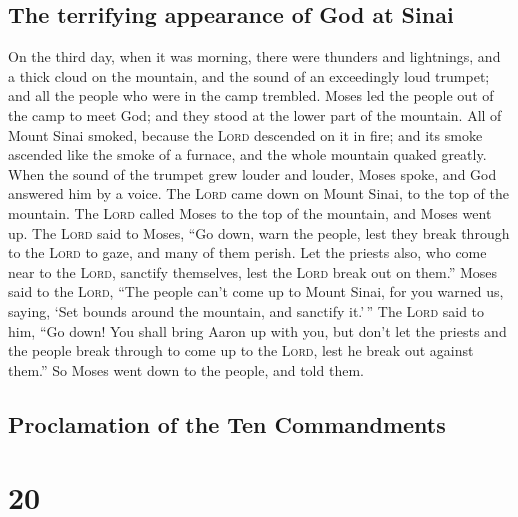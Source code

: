 \hypertarget{the-terrifying-appearance-of-god-at-sinai}{%
\subsection{The terrifying appearance of God at
Sinai}\label{the-terrifying-appearance-of-god-at-sinai}}

 On the third day, when it was morning, there were
thunders and lightnings, and a thick cloud on the mountain, and the
sound of an exceedingly loud trumpet; and all the people who were in the
camp trembled.  Moses led the people out of the camp to
meet God; and they stood at the lower part of the mountain.
 All of Mount Sinai smoked, because the \textsc{Lord}
descended on it in fire; and its smoke ascended like the smoke of a
furnace, and the whole mountain quaked greatly.  When the
sound of the trumpet grew louder and louder, Moses spoke, and God
answered him by a voice.  The \textsc{Lord} came down on
Mount Sinai, to the top of the mountain. The \textsc{Lord} called Moses
to the top of the mountain, and Moses went up.  The
\textsc{Lord} said to Moses, ``Go down, warn the people, lest they break
through to the \textsc{Lord} to gaze, and many of them perish.
 Let the priests also, who come near to the
\textsc{Lord}, sanctify themselves, lest the \textsc{Lord} break out on
them.''  Moses said to the \textsc{Lord}, ``The people
can't come up to Mount Sinai, for you warned us, saying, `Set bounds
around the mountain, and sanctify it.'\,''  The
\textsc{Lord} said to him, ``Go down! You shall bring Aaron up with you,
but don't let the priests and the people break through to come up to the
\textsc{Lord}, lest he break out against them.''  So
Moses went down to the people, and told them.

\hypertarget{proclamation-of-the-ten-commandments}{%
\subsection{Proclamation of the Ten
Commandments}\label{proclamation-of-the-ten-commandments}}

\hypertarget{section-19}{%
\section{20}\label{section-19}}

